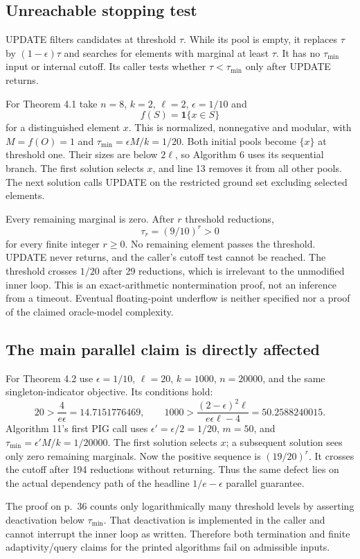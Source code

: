 \documentclass[10pt]{article}
\begin{document}
\subsection*{Unreachable stopping test}
UPDATE filters candidates at threshold \(\tau\). While its pool is empty, it replaces \(\tau\) by \((1-\epsilon)\tau\) and searches for elements with marginal at least \(\tau\). It has no \(\tau_{\min}\) input or internal cutoff. Its caller tests whether \(\tau<\tau_{\min}\) only after UPDATE returns.\par
For Theorem 4.1 take \(n=8\), \(k=2\), \(\ell=2\), \(\epsilon=1/10\) and \[f(S)=\mathbf1\{x\in S\}\] for a distinguished element \(x\). This is normalized, nonnegative and modular, with \(M=f(O)=1\) and \(\tau_{\min}=\epsilon M/k=1/20\). Both initial pools become \(\{x\}\) at threshold one. Their sizes are below \(2\ell\), so Algorithm 6 uses its sequential branch. The first solution selects \(x\), and line 13 removes it from all other pools. The next solution calls UPDATE on the restricted ground set excluding selected elements.\par
Every remaining marginal is zero. After \(r\) threshold reductions, \[\tau_r=(9/10)^r>0\] for every finite integer \(r\ge0\). No remaining element passes the threshold. UPDATE never returns, and the caller’s cutoff test cannot be reached. The threshold crosses \(1/20\) after 29 reductions, which is irrelevant to the unmodified inner loop. This is an exact-arithmetic nontermination proof, not an inference from a timeout. Eventual floating-point underflow is neither specified nor a proof of the claimed oracle-model complexity.\par
\subsection*{The main parallel claim is directly affected}
For Theorem 4.2 use \(\epsilon=1/10\), \(\ell=20\), \(k=1000\), \(n=20000\), and the same singleton-indicator objective. Its conditions hold: \[20>\frac4{e\epsilon}=14.7151776469,\qquad
 1000>\frac{(2-\epsilon)^2\ell}{e\epsilon\ell-4}
 =50.2588240015.\] Algorithm 11’s first PIG call uses \(\epsilon'=\epsilon/2=1/20\), \(m=50\), and \(\tau_{\min}=\epsilon'M/k=1/20000\). The first solution selects \(x\); a subsequent solution sees only zero remaining marginals. Now the positive sequence is \((19/20)^r\). It crosses the cutoff after 194 reductions without returning. Thus the same defect lies on the actual dependency path of the headline \(1/e-\epsilon\) parallel guarantee.\par
The proof on p. 36 counts only logarithmically many threshold levels by asserting deactivation below \(\tau_{\min}\). That deactivation is implemented in the caller and cannot interrupt the inner loop as written. Therefore both termination and finite adaptivity/query claims for the printed algorithms fail on admissible inputs.\par
\end{document}
